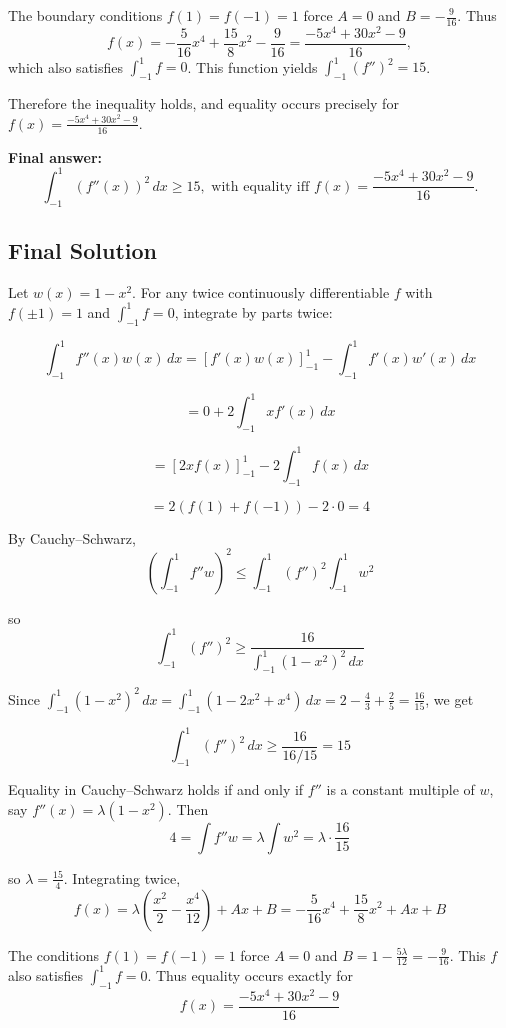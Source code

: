 \documentclass[12pt,a4paper]{article}
\theoremstyle{definition}
\begin{document}
    The boundary conditions $f(1) = f(-1) = 1$ force $A = 0$ and $B = -\frac{9}{16}$. Thus
    $$f(x) = -\frac{5}{16} x^4 + \frac{15}{8} x^2 - \frac{9}{16} = \frac{-5 x^4 + 30 x^2 - 9}{16},$$
    which also satisfies $\int_{-1}^1 f = 0$. This function yields $\int_{-1}^1 (f'')^2 = 15$.

    Therefore the inequality holds, and equality occurs precisely for $f(x) = \frac{-5 x^4 + 30 x^2 - 9}{16}$.

    \textbf{Final answer:}
    $$\int_{-1}^{1} (f''(x))^2 \, dx \geq 15, \text{ with equality iff } f(x) = \frac{-5 x^4 + 30 x^2 - 9}{16}.$$

    \subsection{Final Solution}
    Let $w(x) = 1 - x^2$. For any twice continuously differentiable $f$ with $f(\pm 1) = 1$ and $\int_{-1}^{1} f = 0$, integrate by parts twice:

    $$\int_{-1}^{1} f''(x) w(x) \, dx = [f'(x) w(x)]_{-1}^1 - \int_{-1}^{1} f'(x) w'(x) \, dx$$

    $$= 0 + 2\int_{-1}^{1} x f'(x) \, dx$$

    $$= [2x f(x)]_{-1}^1 - 2\int_{-1}^{1} f(x) \, dx$$

    $$= 2(f(1) + f(-1)) - 2 \cdot 0 = 4$$

    By Cauchy--Schwarz,
    $$\left(\int_{-1}^{1} f'' w\right)^2 \leq \int_{-1}^{1} (f'')^2 \int_{-1}^{1} w^2$$

    so
    $$\int_{-1}^{1} (f'')^2 \geq \frac{16}{\int_{-1}^{1} (1 - x^2)^2 \, dx}$$

    Since $\int_{-1}^{1} (1 - x^2)^2 \, dx = \int_{-1}^{1} (1 - 2x^2 + x^4) \, dx = 2 - \frac{4}{3} + \frac{2}{5} = \frac{16}{15}$, we get

    $$\int_{-1}^{1} (f'')^2 \, dx \geq \frac{16}{16/15} = 15$$

    Equality in Cauchy--Schwarz holds if and only if $f''$ is a constant multiple of $w$, say $f''(x) = \lambda(1 - x^2)$. Then
    $$4 = \int f'' w = \lambda \int w^2 = \lambda \cdot \frac{16}{15}$$

    so $\lambda = \frac{15}{4}$. Integrating twice,
    $$f(x) = \lambda\left(\frac{x^2}{2} - \frac{x^4}{12}\right) + Ax + B = -\frac{5}{16}x^4 + \frac{15}{8}x^2 + Ax + B$$

    The conditions $f(1) = f(-1) = 1$ force $A = 0$ and $B = 1 - \frac{5\lambda}{12} = -\frac{9}{16}$. This $f$ also satisfies $\int_{-1}^{1} f = 0$. Thus equality occurs exactly for
    $$f(x) = \frac{-5x^4 + 30x^2 - 9}{16}$$
\end{document}
